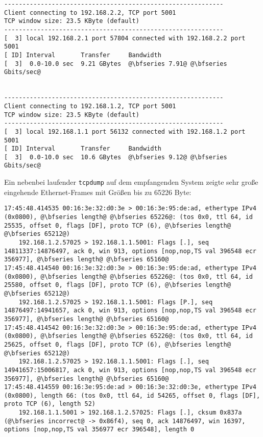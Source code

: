 \setupVerbatimOut
\begin{verbatim}
------------------------------------------------------------
Client connecting to 192.168.2.2, TCP port 5001
TCP window size: 23.5 KByte (default)
------------------------------------------------------------
[  3] local 192.168.2.1 port 57804 connected with 192.168.2.2 port 5001
[ ID] Interval       Transfer     Bandwidth
[  3]  0.0-10.0 sec  9.21 GBytes  @\bfseries 7.91@ @\bfseries Gbits/sec@


------------------------------------------------------------
Client connecting to 192.168.1.2, TCP port 5001
TCP window size: 23.5 KByte (default)
------------------------------------------------------------
[  3] local 192.168.1.1 port 56132 connected with 192.168.1.2 port 5001
[ ID] Interval       Transfer     Bandwidth
[  3]  0.0-10.0 sec  10.6 GBytes  @\bfseries 9.12@ @\bfseries Gbits/sec@
\end{verbatim}
Ein nebenbei laufender \verb#tcpdump# auf dem empfangenden System zeigte sehr große eingehende Ethernet-Frames mit Größen bis zu 65226 Byte: 
\setupVerbatimOut
\begin{verbatim}
17:45:48.414535 00:16:3e:32:d0:3e > 00:16:3e:95:de:ad, ethertype IPv4 (0x0800), @\bfseries length@ @\bfseries 65226@: (tos 0x0, ttl 64, id 25535, offset 0, flags [DF], proto TCP (6), @\bfseries length@ @\bfseries 65212@)
    192.168.1.2.57025 > 192.168.1.1.5001: Flags [.], seq 14811337:14876497, ack 0, win 913, options [nop,nop,TS val 396548 ecr 356977], @\bfseries length@ @\bfseries 65160@
17:45:48.414540 00:16:3e:32:d0:3e > 00:16:3e:95:de:ad, ethertype IPv4 (0x0800), @\bfseries length@ @\bfseries 65226@: (tos 0x0, ttl 64, id 25580, offset 0, flags [DF], proto TCP (6), @\bfseries length@ @\bfseries 65212@)
    192.168.1.2.57025 > 192.168.1.1.5001: Flags [P.], seq 14876497:14941657, ack 0, win 913, options [nop,nop,TS val 396548 ecr 356977], @\bfseries length@ @\bfseries 65160@
17:45:48.414542 00:16:3e:32:d0:3e > 00:16:3e:95:de:ad, ethertype IPv4 (0x0800), @\bfseries length@ @\bfseries 65226@: (tos 0x0, ttl 64, id 25625, offset 0, flags [DF], proto TCP (6), @\bfseries length@ @\bfseries 65212@)
    192.168.1.2.57025 > 192.168.1.1.5001: Flags [.], seq 14941657:15006817, ack 0, win 913, options [nop,nop,TS val 396548 ecr 356977], @\bfseries length@ @\bfseries 65160@
17:45:48.414559 00:16:3e:95:de:ad > 00:16:3e:32:d0:3e, ethertype IPv4 (0x0800), length 66: (tos 0x0, ttl 64, id 54265, offset 0, flags [DF], proto TCP (6), length 52)
    192.168.1.1.5001 > 192.168.1.2.57025: Flags [.], cksum 0x837a (@\bfseries incorrect@ -> 0x86f4), seq 0, ack 14876497, win 16397, options [nop,nop,TS val 356977 ecr 396548], length 0
\end{verbatim}
